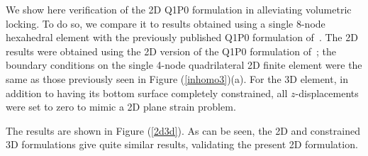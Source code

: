 \documentclass[8.5pt,twoside,twocolumn]{article}
\begin{document}
We show here verification of the 2D Q1P0 formulation in alleviating volumetric locking.  To do so, we compare it to results obtained using a single 8-node hexahedral element with the previously published Q1P0 formulation of~\citet{parkCMAME2013}.  The 2D results were obtained using the 2D version of the Q1P0 formulation of~\citet{simoCMAME1985}; the boundary conditions on the single 4-node quadrilateral 2D finite element were the same as those previously seen in Figure (\ref{inhomo3})(a).  For the 3D element, in addition to having its bottom surface completely constrained, all $z$-displacements were set to zero to mimic a 2D plane strain problem.  

The results are shown in Figure (\ref{2d3d}).  As can be seen, the 2D and constrained 3D formulations give quite similar results, validating the present 2D formulation.

\footnotesize{
}
\end{document}
